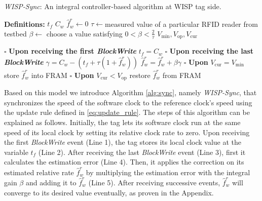 \documentclass[journal,draftcls,onecolumn,12pt,twoside]{IEEEtranTCOM}
\begin{document}
\begin{algorithm}[t]
	\caption{\label{alg:sync} \emph{WISP-Sync}: An integral controller-based 
		algorithm at WISP tag side.}
	\begin{algorithmic}[1]	
		\scriptsize	

		\Statex\textbf{Definitions:}
		\Statex$t_f$  
		\Statex $C_w$ 
		\Statex $\hat{f}_w^r\leftarrow0$ 	
		\Statex $\tau\leftarrow$measured value of a particular RFID reader from 
		testbed 
		\Statex $\beta\leftarrow$ choose a value satisfying 
		$0<\beta<\frac{2}{\tau}$ 	
		\Statex $V_{\min}, V_{\text{op}}, V_{\text{cur}}$ 
		
		\State $\square$ \textbf{Upon receiving the first \emph{BlockWrite}} 
		\State \quad $ t_f = C_w$ 
		\State $\square$ \textbf{Upon receiving the last \emph{BlockWrite}} 
		\State \quad $\gamma = C_w- (t_f+\tau(1+\hat{f}_w^r))$ 
		\State \quad $\hat{f}_w^r = \hat{f}_w^r +\beta\gamma$ 
		\State $\square$ \textbf{Upon} $V_{\text{cur}}=V_{\min}$
		\State \quad store $\hat{f}_w^r$ into FRAM 
		\State $\square$ \textbf{Upon} $V_{\text{cur}} < V_{\text{op}}$
		\State \quad restore $\hat{f}_w^r$ from FRAM 
	\end{algorithmic}	
\end{algorithm}

Based on this model we introduce Algorithm \ref{alg:sync}, namely \emph{WISP-Sync}, that synchronizes the speed of the software clock to the reference clock's speed using the update rule defined in \eqref{eq:update_rule}. The steps of this algorithm can be explained as follows. Initially, the tag lets its software clock run at the same speed of its local clock by setting its relative clock rate to zero. Upon receiving the first \emph{BlockWrite} event (Line 1), the tag stores its local clock value at the variable $t_f$ (Line 2). After receiving the last \emph{BlockWrite} event (Line 3), first it calculates the estimation error (Line 4). Then, it applies the correction on its estimated relative rate $\hat{f}_w^r$ by multiplying the estimation error with the integral gain $\beta$ and adding it to $\hat{f}_w^r$ (Line 5). After receiving successive events, $\hat{f}_w^r$ will converge to its desired value eventually, as proven in the Appendix. 
\end{document}
